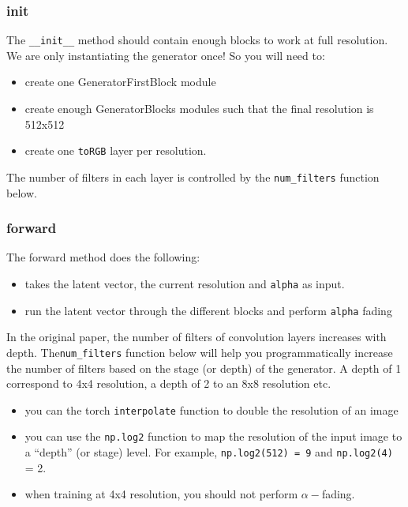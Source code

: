 \subsubsection{init}
The \lstinline{__init__} method should contain enough blocks to work at full resolution. We are only instantiating the generator once! So you will need to: 
\begin{itemize}
    \item create one GeneratorFirstBlock module
    \item create enough GeneratorBlocks modules such that the final resolution is 512x512
    \item create one \lstinline{toRGB} layer per resolution.
\end{itemize}

The number of filters in each layer is controlled by the \lstinline{num_filters} function below.

\subsubsection{forward}
The forward method does the following: 
\begin{itemize}
    \item takes the latent vector, the current resolution and \lstinline{alpha} as input.
    \item run the latent vector through the different blocks and perform \lstinline{alpha} fading
\end{itemize}

In the original paper, the number of filters of convolution layers increases with depth. The\lstinline{num_filters} function below will help you programmatically increase the number of filters based on the stage (or depth) of the generator. A depth of 1 correspond to 4x4 resolution, a depth of 2 to an 8x8 resolution etc.

\begin{itemize}
    \item you can the torch \lstinline{interpolate} function to double the resolution of an image
    \item you can use the \lstinline{np.log2} function to map the resolution of the input image to a ``depth'' (or stage) level. For example, \lstinline{np.log2(512) = 9} and \lstinline{np.log2(4)} = 2.
    \item when training at 4x4 resolution, you should not perform \(\alpha-\)fading.
\end{itemize}

